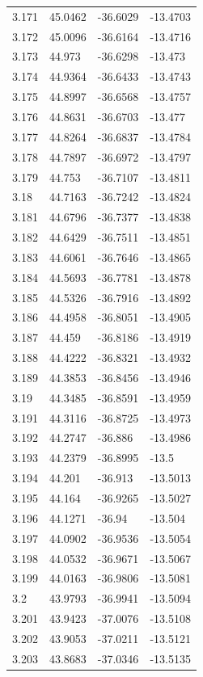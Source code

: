 \begin{tabular}{llll}
3.171 & 45.0462 & -36.6029 & -13.4703 \\
3.172 & 45.0096 & -36.6164 & -13.4716 \\
3.173 & 44.973 & -36.6298 & -13.473 \\
3.174 & 44.9364 & -36.6433 & -13.4743 \\
3.175 & 44.8997 & -36.6568 & -13.4757 \\
3.176 & 44.8631 & -36.6703 & -13.477 \\
3.177 & 44.8264 & -36.6837 & -13.4784 \\
3.178 & 44.7897 & -36.6972 & -13.4797 \\
3.179 & 44.753 & -36.7107 & -13.4811 \\
3.18 & 44.7163 & -36.7242 & -13.4824 \\
3.181 & 44.6796 & -36.7377 & -13.4838 \\
3.182 & 44.6429 & -36.7511 & -13.4851 \\
3.183 & 44.6061 & -36.7646 & -13.4865 \\
3.184 & 44.5693 & -36.7781 & -13.4878 \\
3.185 & 44.5326 & -36.7916 & -13.4892 \\
3.186 & 44.4958 & -36.8051 & -13.4905 \\
3.187 & 44.459 & -36.8186 & -13.4919 \\
3.188 & 44.4222 & -36.8321 & -13.4932 \\
3.189 & 44.3853 & -36.8456 & -13.4946 \\
3.19 & 44.3485 & -36.8591 & -13.4959 \\
3.191 & 44.3116 & -36.8725 & -13.4973 \\
3.192 & 44.2747 & -36.886 & -13.4986 \\
3.193 & 44.2379 & -36.8995 & -13.5 \\
3.194 & 44.201 & -36.913 & -13.5013 \\
3.195 & 44.164 & -36.9265 & -13.5027 \\
3.196 & 44.1271 & -36.94 & -13.504 \\
3.197 & 44.0902 & -36.9536 & -13.5054 \\
3.198 & 44.0532 & -36.9671 & -13.5067 \\
3.199 & 44.0163 & -36.9806 & -13.5081 \\
3.2 & 43.9793 & -36.9941 & -13.5094 \\
3.201 & 43.9423 & -37.0076 & -13.5108 \\
3.202 & 43.9053 & -37.0211 & -13.5121 \\
3.203 & 43.8683 & -37.0346 & -13.5135 \\

\end{tabular}
